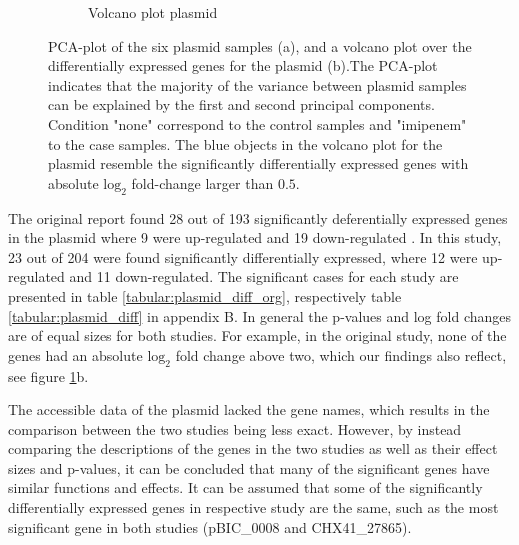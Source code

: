 \begin{figure}[ht]
\begin{subfigure}{0.47\textwidth}
        \caption{Volcano plot plasmid}
    \end{subfigure}
    \caption{PCA-plot of the six plasmid samples (a), and a volcano plot over the differentially expressed genes for the plasmid (b).The PCA-plot indicates that the majority of the variance between plasmid samples can be explained by the first and second principal components. Condition "none" correspond to the control samples and "imipenem" to the case samples. The blue objects in the volcano plot for the plasmid resemble the significantly differentially expressed genes with absolute $\mathrm{log}_2$ fold-change larger than $0.5$.}
    \label{fig:pca_volc_plasmid}
\end{figure}

 The original report found 28 out of 193 significantly deferentially expressed genes in the plasmid where 9 were up-regulated and 19 down-regulated \cite{jousset2018transcriptional}. In this study, 23 out of 204 were found significantly differentially expressed, where 12 were up-regulated and 11 down-regulated. The significant cases for each study are presented in table \ref{tabular:plasmid_diff_org}, respectively table \ref{tabular:plasmid_diff} in appendix B. In general the p-values and log fold changes are of equal sizes for both studies. For example, in the original study, none of the genes had an absolute $\mathrm{log}_2$ fold change above two, which our findings also reflect, see figure \ref{fig:pca_volc_plasmid}b. 
 
 The accessible data of the plasmid lacked the gene names, which results in the comparison between the two studies being less exact. However, by instead comparing the descriptions of the genes in the two studies as well as their effect sizes and p-values, it can be concluded that many of the significant genes have similar functions and effects. It can be assumed that some of the significantly differentially expressed genes in respective study are the same, such as the most significant gene in both studies (pBIC\_0008 and CHX41\_27865).